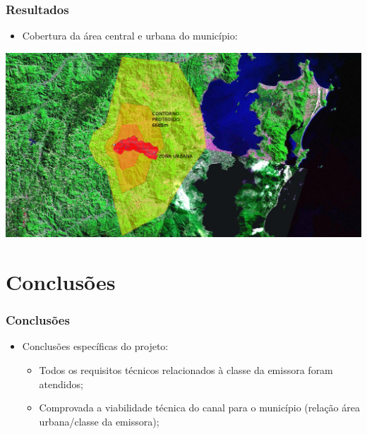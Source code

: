 \documentclass{beamer}
\begin{document}
    
        \begin{frame}
    
	\frametitle{Resultados}
      \begin{itemize}
      
         \item Cobertura da área central e urbana do município:
      \end{itemize}
	  \begin{center}
      
           \includegraphics[width=.8\linewidth]{figs/contornoAreaUrbana.png}	
           
	  \end{center}
      
	\end{frame}

	
	
    \section{Conclusões}
    \begin{frame}
    \frametitle{Conclusões}
    
    \begin{itemize}
    
    \item Conclusões específicas do projeto:
   
    \begin{itemize}
    \item Todos os requisitos técnicos relacionados à classe da emissora foram atendidos;
    \item Comprovada a viabilidade técnica do canal para o município (relação área urbana/classe da emissora);
    \end{itemize}
    \end{itemize}
    \end{frame}
    
\end{document}
